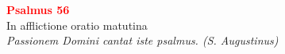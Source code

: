


\def\greinitialformat#1{%
{\fontsize{39}{39}\selectfont #1}%
}




\vspace{0.3cm}
\begin{center}
 \textcolor{red}{\large \bf Psalmus 56}\\
In afflictione oratio matutina\\
\textit{\small Passionem Domini cantat iste psalmus. (S. Augustinus)}
\end{center}
